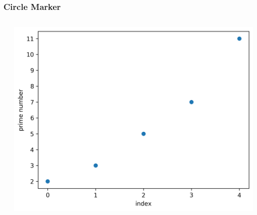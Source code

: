 \documentclass[xcolor={svgnames}]{beamer}
\newcommand{\pyfile}[2][]{}
\begin{document}
\begin{frame}[t,fragile]
    \frametitle{Circle Marker}
    \vspace{5mm}
    \begin{columns}[T]
        \begin{column}{0.52\textwidth}
            \pyfile{examples/08-circle-marker.py}
        \end{column}
        \begin{column}{0.48\textwidth}
            \includegraphics[width=\textwidth]{img/08-circle-marker.png}
        \end{column}
    \end{columns}
\end{frame}
\end{document}
